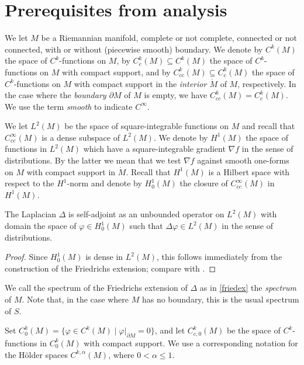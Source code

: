 \section{Prerequisites from analysis}\label{anapre}

We let $M$ be a Riemannian manifold, complete or not complete,
connected or not connected, with or without (piecewise smooth) boundary.
We denote by $C^k(M)$ the space of $C^k$-functions on $M$,
by $C^k_{c}(M)\subseteq C^k(M)$
the space of $C^k$-functions on $M$ with compact support,
and by $C^k_{cc}(M)\subseteq C^k_c(M)$
the space of $C^k$-functions on $M$ with compact support
in the \emph{interior $\mathring M$} of $M$, respectively.
In the case where the \emph{boundary $\partial M$} of $M$ is empty,
we have $C^k_{cc}(M)=C^k_c(M)$.
We use the term \emph{smooth} to indicate $C^\infty$.

We let $L^2(M)$ be the space of square-integrable functions on $M$
and recall that $C^\infty_{cc}(M)$ is a dense subspace of $L^2(M)$.
We denote by $H^1(M)$ the space of functions in $L^2(M)$
which have a square-integrable gradient $\nabla f$ in the sense of distributions.
By the latter we mean that we test $\nabla f$ against smooth one-forms on $M$
with compact support in $\mathring M$.
Recall that $H^1(M)$ is a Hilbert space with respect to the $H^1$-norm
and denote by $H^1_0(M)$ the closure of $C^\infty_{cc}(M)$ in $H^1(M)$.

\begin{prop}\label{friedex}
The Laplacian $\Delta$ is self-adjoint as an unbounded operator on $L^2(M)$
with domain the space of ${\varphi}\in H^1_0(M)$ such that $\Delta{\varphi}\in L^2(M)$
in the sense of distributions.
\end{prop} 

\begin{proof}
Since $H^1_0(M)$ is dense in $L^2(M)$,
this follows immediately from the construction of the Friedrichs extension;
compare with \cite[Section A.8]{T2}.
\end{proof}

We call the spectrum of the Friedrichs extension of $\Delta$ as in \cref{friedex}
the \emph{spectrum} of $M$.
Note that, in the case where $M$ has no boundary,
this is the usual spectrum of $S$.

Set $C^k_{0}(M) = \{{\varphi}\in C^k(M)\mid{\varphi}|_{\partial M}=0\}$,
and let $C^k_{c,0}(M)$ be the space of $C^k$-functions
in $C^k_{0}(M)$ with compact support.
We use a corresponding notation for the H\"older spaces $C^{k,\alpha}(M)$,
where $0<\alpha\le1$.

